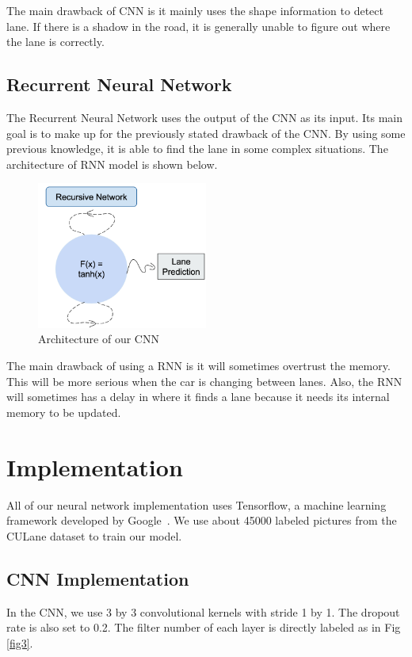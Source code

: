 \documentclass[runningheads]{llncs}
\begin{document}
The main drawback of CNN is it mainly uses the shape information to detect lane. If there is a shadow in the road, it is generally unable to figure out where the lane is correctly.

\subsection{Recurrent Neural Network}

The Recurrent Neural Network uses the output of the CNN as its input. Its main goal is to make up for the previously stated drawback of the CNN. By using some previous knowledge, it is able to find the lane in some complex situations. The architecture of RNN model is shown below.

\begin{figure}[h]
\centering
\includegraphics[width=0.5\textwidth]{Figure4}
\caption{Architecture of our CNN} \label{fig4}
\end{figure}

The main drawback of using a RNN is it will sometimes overtrust the memory. This will be more serious when the car is changing between lanes. Also, the RNN will sometimes has a delay in where it finds a lane because it needs its internal memory to be updated.

\section{Implementation}
All of our neural network implementation uses Tensorflow, a machine learning framework developed by Google~\cite{ref:11}. We use about 45000 labeled pictures from the CULane dataset to train our model.

\subsection{CNN Implementation}
In the CNN, we use 3 by 3 convolutional kernels with stride 1 by 1. The dropout rate is also set to 0.2. The filter number of each layer is directly labeled as in Fig \ref{fig3}. \\
\end{document}
